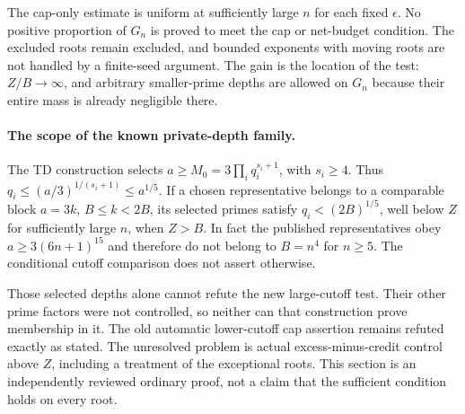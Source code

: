 The cap-only estimate is uniform at sufficiently large $n$ for each
fixed $\epsilon$. No positive proportion of $G_n$ is proved to meet
the cap or net-budget condition. The excluded roots remain excluded,
and bounded exponents with moving roots are not handled by a
finite-seed argument. The gain is the location of the test: $Z/B\to\infty$,
and arbitrary smaller-prime depths are allowed on $G_n$ because
their entire mass is already negligible there.

\paragraph{The scope of the known private-depth family.}
The TD construction selects $a\ge M_0=3\prod_iq_i^{s_i+1}$,
with $s_i\ge4$. Thus $q_i\le(a/3)^{1/(s_i+1)}\le a^{1/5}$.
If a chosen representative belongs to a comparable block $a=3k$,
$B\le k<2B$, its selected primes satisfy $q_i<(2B)^{1/5}$,
well below $Z$ for sufficiently large $n$, when $Z>B$. In fact the published representatives
obey $a\ge3(6n+1)^{15}$ and therefore do not belong to $B=n^4$
for $n\ge5$. The conditional cutoff comparison does not assert
otherwise.

Those selected depths alone cannot refute the new large-cutoff test.
Their other prime factors were not controlled, so neither can that
construction prove membership in it. The old automatic lower-cutoff
cap assertion remains refuted exactly as stated. The unresolved
problem is actual excess-minus-credit control above $Z$, including
a treatment of the exceptional roots. This section is an independently
reviewed ordinary proof, not a claim that the sufficient condition
holds on every root.
